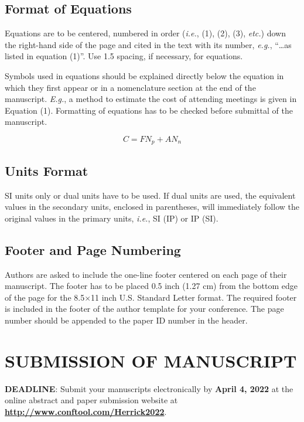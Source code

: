 \documentclass[10pt]{extarticle}
\begin{document}
\subsection{Format of Equations}
Equations are to be centered, numbered in order (\textit{i.e.}, (1), (2), (3), \textit{etc.}) down the right-hand side of the page and cited in the text with its number, \textit{e.g.}, ``\ldots as listed in equation (1)''.  Use 1.5 spacing, if necessary, for equations.  

Symbols used in equations should be explained directly below the equation in which they first appear or in a nomenclature section at the end of the manuscript. \textit{E.g.}, a method \cite{Cheap_1986} to estimate the cost of attending meetings is given in Equation (1). Formatting of equations has to be checked before submittal of the manuscript.

\begin{equation}
C = FN_p+AN_n
\end{equation}

\subsection{Units Format}
SI units only or dual units have to be used.  If dual units are used, the equivalent values in the secondary units, enclosed in parentheses, will immediately follow the original values in the primary units, \textit{i.e.}, SI (IP) or IP (SI).

\subsection{Footer and Page Numbering}
Authors are asked to include the one-line footer centered on each page of their manuscript. The footer has to be placed 0.5 inch (1.27 cm) from the bottom edge of the page for the 8.5$\times$11 inch U.S. Standard Letter format.  The required footer is included in the footer of the author template for your conference. The page number should be appended to the paper ID number in the header. 


\section{SUBMISSION OF MANUSCRIPT}

\textbf{DEADLINE}: Submit your manuscripts electronically by \textbf{April 4, 2022} at the online abstract and paper submission website at \textbf{\url{http://www.conftool.com/Herrick2022}}. 
\end{document}
